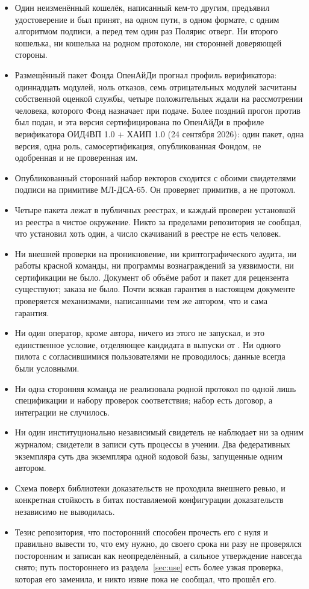 \begin{itemize}
  \item Один неизменённый кошелёк, написанный кем-то другим, предъявил удостоверение и был принят,
    на одном пути, в одном формате, с одним алгоритмом подписи, а перед тем один раз Полярис
    отверг. Ни второго кошелька, ни кошелька на родном протоколе, ни сторонней доверяющей
    стороны.
  \item Размещённый пакет Фонда ОпенАйДи прогнал профиль верификатора: одиннадцать модулей, ноль
    отказов, семь отрицательных модулей засчитаны собственной оценкой службы, четыре положительных
    ждали на рассмотрении человека, которого Фонд назначает при подаче. Более поздний прогон
    против  был подан, и эта версия сертифицирована по ОпенАйДи в
    профиле верификатора ОИД4ВП 1.0 + ХАИП 1.0 (24 сентября 2026): один пакет, одна версия, одна
    роль, самосертификация, опубликованная Фондом, не одобренная и не проверенная им.
  \item Опубликованный сторонний набор векторов сходится с обоими свидетелями подписи на
    примитиве МЛ-ДСА-65. Он проверяет примитив, а не протокол.
  \item Четыре пакета лежат в публичных реестрах, и каждый проверен установкой из реестра в
    чистое окружение. Никто за пределами репозитория не сообщал, что установил хоть один, а число
    скачиваний в реестре не есть человек.
  \item Ни внешней проверки на проникновение, ни криптографического аудита, ни работы красной
    команды, ни программы вознаграждений за уязвимости, ни сертификации не было. Документ об
    объёме работ и пакет для рецензента существуют; заказа не было. Почти всякая гарантия в
    настоящем документе проверяется механизмами, написанными тем же автором, что и сама
    гарантия.
  \item Ни один оператор, кроме автора, ничего из этого не запускал, и это единственное условие,
    отделяющее кандидата в выпуски от . Ни одного пилота с согласившимися
    пользователями не проводилось; данные всегда были условными.
  \item Ни одна сторонняя команда не реализовала родной протокол по одной лишь спецификации и
    набору проверок соответствия; набор есть договор, а интеграции не случилось.
  \item Ни один институционально независимый свидетель не наблюдает ни за одним журналом;
    свидетели в записи суть процессы в учении. Два федеративных экземпляра суть два экземпляра
    одной кодовой базы, запущенные одним автором.
  \item Схема поверх библиотеки доказательств не проходила внешнего ревью, и конкретная стойкость в
    битах поставляемой конфигурации доказательств независимо не выводилась.
  \item Тезис репозитория, что посторонний способен прочесть его с нуля и правильно вывести то, что
    ему нужно, до своего срока ни разу не проверялся посторонним и записан как неопределённый, а
    сильное утверждение навсегда снято; путь постороннего из раздела~\ref{sec:use} есть более узкая
    проверка, которая его заменила, и никто извне пока не сообщал, что прошёл его.
\end{itemize}

